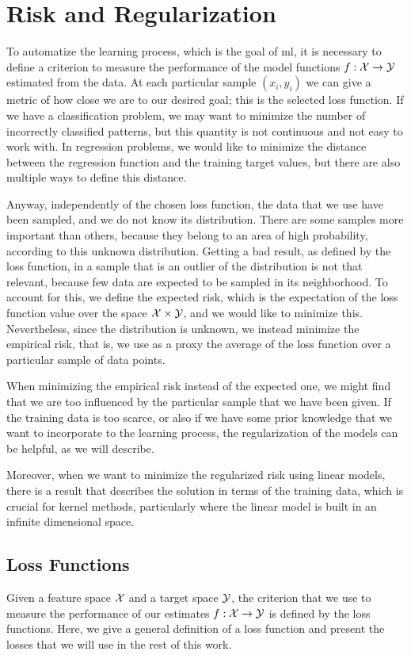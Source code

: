 \section{Risk and Regularization}
To automatize the learning process, which is the goal of \acrshort{ml}, it is necessary to define a criterion to measure the performance of the model functions $f: \mathcal{X} \to \mathcal{Y}$ estimated from the data.
At each particular sample $(x_i, y_i)$ we can give a metric of how close we are to our desired goal; this is the selected loss function. If we have a classification problem, we may want to minimize the number of incorrectly classified patterns, but this quantity is not continuous and not easy to work with. In regression problems, we would like to minimize the distance between the regression function and the training target values, but there are also multiple ways to define this distance. 
%

Anyway, independently of the chosen loss function, the data that we use have been sampled, and we do not know its distribution. There are some samples more important than others, because they belong to an area of high probability, according to this unknown distribution. Getting a bad result, as defined by the loss function, in a sample that is an outlier of the distribution is not that relevant, because few data are expected to be sampled in its neighborhood. 
To account for this, we define the expected risk, which is the expectation of the loss function value over the space $\mathcal{X} \times \mathcal{Y}$, and we would like to minimize this. Nevertheless, since the distribution is unknown, we instead minimize the empirical risk, that is, we use as a proxy the average of the loss function over a particular sample of data points.

%
When minimizing the empirical risk instead of the expected one, we might find that we are too influenced by the particular sample that we have been given.  If the training data is too scarce, or also if we have some prior knowledge that we want to incorporate to the learning process, the regularization of the models can be helpful, as we will describe.
%

Moreover, when we want to minimize the regularized risk using linear models, there is a result that describes the solution in terms of the training data, which is crucial for kernel methods, particularly where the linear model is built in an infinite dimensional space.

\subsection{Loss Functions}
Given a feature space $\mathcal{X}$ and a target space $\mathcal{Y}$, the criterion that we use to measure the performance of our estimates $f: \mathcal{X} \to \mathcal{Y}$ is defined by the loss functions.
Here, we give a general definition of a loss function and present the losses that we will use in the rest of this work.

